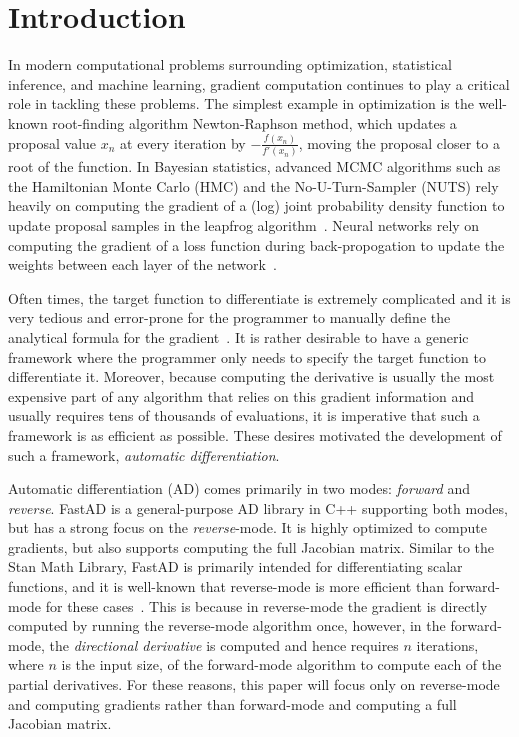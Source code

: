 \section{Introduction}

In modern computational problems surrounding optimization, statistical inference, and machine learning,
gradient computation continues to play a critical role in tackling these problems.
The simplest example in optimization is the well-known root-finding algorithm Newton-Raphson method,
which updates a proposal value $x_n$ at every iteration by $-\frac{f(x_n)}{f'(x_n)}$,
moving the proposal closer to a root of the function.
In Bayesian statistics, advanced MCMC algorithms
such as the Hamiltonian Monte Carlo (HMC) and the No-U-Turn-Sampler (NUTS) rely
heavily on computing the gradient of a (log) joint probability density function
to update proposal samples in the leapfrog algorithm~\cite{hoffman:2011}\cite{neal:2012}.
Neural networks rely on computing 
the gradient of a loss function during back-propogation
to update the weights between each layer of the network~\cite{goodfellow:2016}.

Often times, the target function to differentiate is extremely complicated
and it is very tedious and error-prone for the programmer to manually define 
the analytical formula for the gradient~\cite{margossian:2018}.
It is rather desirable to have a generic framework where the programmer 
only needs to specify the target function to differentiate it.
Moreover, because computing the derivative is usually the most expensive part of any algorithm
that relies on this gradient information and usually requires tens of thousands of evaluations, 
it is imperative that such a framework is as efficient as possible.
These desires motivated the development of such a framework, \emph{automatic differentiation}.

Automatic differentiation (AD) comes primarily in two modes: \emph{forward} and \emph{reverse}.
FastAD is a general-purpose AD library in C++ supporting both modes, but has a strong focus on the \emph{reverse}-mode.
It is highly optimized to compute gradients, but also supports computing the full Jacobian matrix.
Similar to the Stan Math Library, FastAD is primarily intended for differentiating scalar functions, 
and it is well-known that reverse-mode is more efficient than forward-mode for these cases~\cite{carpenter:2015}.
This is because in reverse-mode the gradient is directly computed by running the reverse-mode algorithm once,
however, in the forward-mode, the \emph{directional derivative} is computed and hence requires 
$n$ iterations, where $n$ is the input size, of the forward-mode algorithm to compute each of the partial derivatives.
For these reasons, this paper will focus only on reverse-mode and computing gradients 
rather than forward-mode and computing a full Jacobian matrix.
